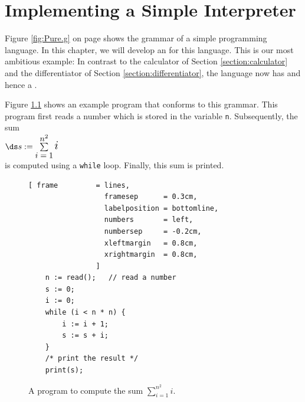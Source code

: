 \chapter{Implementing a Simple Interpreter  \label{chapter:interpreter}}
Figure \ref{fig:Pure.g} on page \pageref{fig:Pure.g} shows the grammar of a simple programming language.
In this chapter, we will develop an  for this language.  This is our most ambitious
example:  In contrast to the calculator of Section \ref{section:calculator} and the differentiator of Section
\ref{section:differentiator}, the language now has  and hence a .

Figure \ref{fig:sum.sl} shows
an example program that conforms to this grammar. This program first reads a number
which is stored in the variable \texttt{n}. Subsequently, the sum
\\[0.2cm]
\hspace*{1.3cm}
$\ds s := \sum\limits_{\mbox{$\normalsize i=1$}}^{\mbox{$\normalsize n^2$}} \mbox{\Large $i$}$
\\[0.2cm]
is computed using a \texttt{while} loop.  Finally, this sum is printed.

\begin{figure}[!ht]
\centering
\begin{Verbatim}[ frame         = lines, 
                  framesep      = 0.3cm, 
                  labelposition = bottomline,
                  numbers       = left,
                  numbersep     = -0.2cm,
                  xleftmargin   = 0.8cm,
                  xrightmargin  = 0.8cm,
                ]
    n := read();   // read a number
    s := 0;
    i := 0;
    while (i < n * n) {
        i := i + 1;
        s := s + i;
    }
    /* print the result */
    print(s);
\end{Verbatim}
\vspace*{-0.3cm}
\caption{A program to compute the sum $\sum\limits_{i=1}^{n^2} i$.}
\label{fig:sum.sl}
\end{figure}

